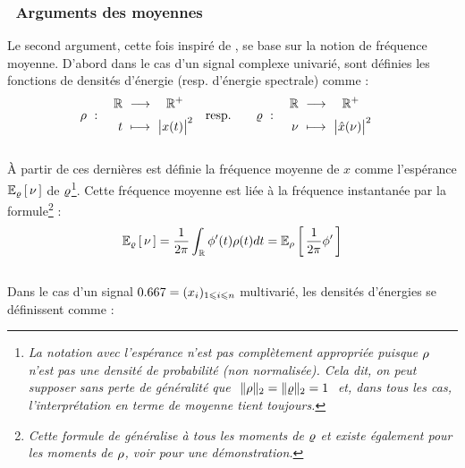 \subsubsection*{\textbullet\ Arguments des moyennes}

Le second argument, cette fois inspiré de \cite{cano_mathematical_2022}, se base sur la notion de fréquence moyenne.
D'abord dans le cas d'un signal complexe univarié, sont définies les fonctions de densités d'énergie (resp. d'énergie spectrale) comme :
\begin{align}\label{eq:densi_dE}
	\densit\ &:\quad \begin{aligned}\R\ &\lr\quad \R^+ \\ t\ &\longmapsto\ \big|x(t)\big|^2 \end{aligned}  
	&
	\text{resp.}\qquad \densis\ &:\quad \begin{aligned}\R\ &\lr\quad \R^+ \\ \nu\ &\longmapsto\ \big|\fou{x}(\nu)\big|^2 \end{aligned}
\end{align}
\\
À partir de ces dernières est définie la fréquence moyenne de $x$ comme l'espérance $\esp[\densis]{\nu}$ de $\densis$\footnote{\itshape
	La notation avec l'espérance n'est pas complètement appropriée puisque $\densit$ n'est pas une densité de probabilité (non normalisée). Cela dit, on peut supposer sans perte de généralité que $\ \|\densit\|_2 = \|\densis\|_2 = 1\ $ et, dans tous les cas, l'interprétation en terme de moyenne tient toujours.
}. Cette fréquence moyenne est liée à la fréquence instantanée par la formule\footnote{\itshape
	Cette formule de généralise à tous les moments de $\densis$ et existe également pour les moments de $\densit$, voir \cite[sec. 1.4]{cohen_time_1995} pour une démonstration.}
:
\begin{equation}\label{eq:esp_freq}
	\esp[\densis]{\nu} = \frac{1}{2\pi}\int_\R \phi'(t)\densit(t)dt = \esp[\densit]{\frac{1}{2\pi} \phi'}
\end{equation}
\\
Dans le cas d'un signal $\x=(x_i)_{1\leq i\leq n}$ multivarié, les densités d'énergies se définissent comme :
